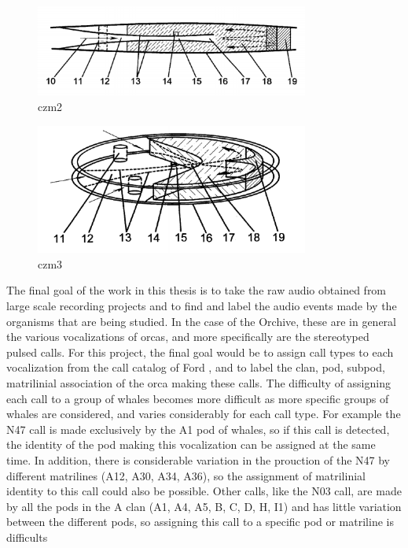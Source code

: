 \documentclass[12pt,oneside]{book}
\begin{document}
\begin{figure}[h]
\centering
\includegraphics[width=90mm]{figures/czm2.png}
\caption{czm2}
\label{fig:czm2}
\end{figure}

\begin{figure}[h]
\centering
\includegraphics[width=90mm]{figures/czm3.png}
\caption{czm3}
\label{fig:czm3}
\end{figure}





\label{chapter:evaluation}

The final goal of the work in this thesis is to take the raw audio
obtained from large scale recording projects and to find and label the
audio events made by the organisms that are being studied.  In the
case of the Orchive, these are in general the various vocalizations of
orcas, and more specifically are the stereotyped pulsed calls.  For
this project, the final goal would be to assign call types to each
vocalization from the call catalog of Ford \cite{ford87}, and to label
the clan, pod, subpod, matrilinial association of the orca making
these calls.  The difficulty of assigning each call to a group of
whales becomes more difficult as more specific groups of whales are
considered, and varies considerably for each call type.  For example
the N47 call is made exclusively by the A1 pod of whales, so if this
call is detected, the identity of the pod making this vocalization can
be assigned at the same time.  In addition, there is considerable
variation in the prouction of the N47 by different matrilines (A12,
A30, A34, A36), so the assignment of matrilinial identity to this call
could also be possible.  Other calls, like the N03 call, are made by
all the pods in the A clan (A1, A4, A5, B, C, D, H, I1) and has little
variation between the different pods, so assigning this call to a
specific pod or matriline is difficults
\end{document}
